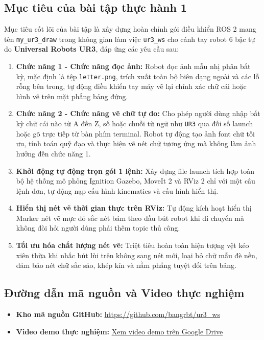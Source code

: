\documentclass[a4paper,12pt]{article}
\begin{document}
\subsection{Mục tiêu của bài tập thực hành 1}
Mục tiêu cốt lõi của bài tập là xây dựng hoàn chỉnh gói điều khiển ROS 2 mang tên \texttt{my\_ur3\_draw} trong không gian làm việc \texttt{ur3\_ws} cho cánh tay robot 6 bậc tự do \textbf{Universal Robots UR3}, đáp ứng các yêu cầu sau:
\begin{enumerate}
    \item \textbf{Chức năng 1 - Chức năng đọc ảnh:} Robot đọc ảnh mẫu nhị phân bất kỳ, mặc định là tệp \texttt{letter.png}, trích xuất toàn bộ biên dạng ngoài và các lỗ rỗng bên trong, tự động điều khiển tay máy vẽ lại chính xác chữ cái hoặc hình vẽ trên mặt phẳng bảng đứng.
    \item \textbf{Chức năng 2 - Chức năng vẽ chữ tự do:} Cho phép người dùng nhập bất kỳ chữ cái nào từ A đến Z, số hoặc chuỗi từ ngữ như \texttt{UR3} qua đối số launch hoặc gõ trực tiếp từ bàn phím terminal. Robot tự động tạo ảnh font chữ tối ưu, tính toán quỹ đạo và thực hiện vẽ nét chữ tương ứng mà không làm ảnh hưởng đến chức năng 1.
    \item \textbf{Khởi động tự động trọn gói 1 lệnh:} Xây dựng file launch tích hợp toàn bộ hệ thống mô phỏng Ignition Gazebo, MoveIt 2 và RViz 2 chỉ với một câu lệnh đơn, tự động nạp cấu hình kinematics và cấu hình hiển thị.
    \item \textbf{Hiển thị nét vẽ thời gian thực trên RViz:} Tự động kích hoạt hiển thị Marker nét vẽ mực đỏ sắc nét bám theo đầu bút robot khi di chuyển mà không đòi hỏi người dùng phải thêm topic thủ công.
    \item \textbf{Tối ưu hóa chất lượng nét vẽ:} Triệt tiêu hoàn toàn hiện tượng vệt kéo xiên thừa khi nhấc bút lùi trên không sang nét mới, loại bỏ chữ mẫu đè nền, đảm bảo nét chữ sắc sảo, khép kín và nằm phẳng tuyệt đối trên bảng.
\end{enumerate}

\subsection{Đường dẫn mã nguồn và Video thực nghiệm}
\begin{itemize}
    \item \textbf{Kho mã nguồn GitHub:} \href{https://github.com/bangrbt/ur3_ws}{\color{blue}\underline{https://github.com/bangrbt/ur3_ws}}
    \item \textbf{Video demo thực nghiệm:} \href{https://drive.google.com/file/d/1Q3-j9rzWxAJLO-lUi8Vy6dT-L9UdswkW/view?usp=sharing}{\color{blue}\underline{Xem video demo trên Google Drive}}
\end{itemize}
\end{document}
